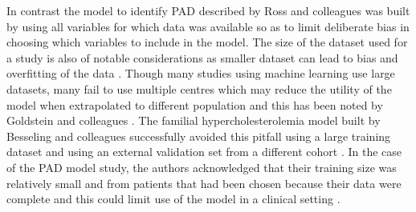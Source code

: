 In contrast the model to identify PAD described by Ross and colleagues \citep{Ross:2016kh} was built by using all variables for which data was available so as to limit deliberate bias in choosing which variables to include in the model.\newline
The size of the dataset used for a study is also of notable considerations as smaller dataset can lead to bias and overfitting  of the data \citep{Steyerberg:2003fq}. Though many studies using machine learning use large datasets, many fail to use multiple centres which may reduce the utility of the model when extrapolated to different population and this has been noted by Goldstein and colleagues \citep{Goldstein:2017bk}.  The familial hypercholesterolemia model built by Besseling and colleagues successfully avoided this pitfall using a large training dataset and using an external validation set from a different cohort \citep{Besseling:2017bs}. In the case of the PAD model study, the authors acknowledged that their training size was relatively small and from patients that had been chosen because their data were complete and this could limit use of the model in a clinical setting \citep{Ross:2016kh}.\newline


